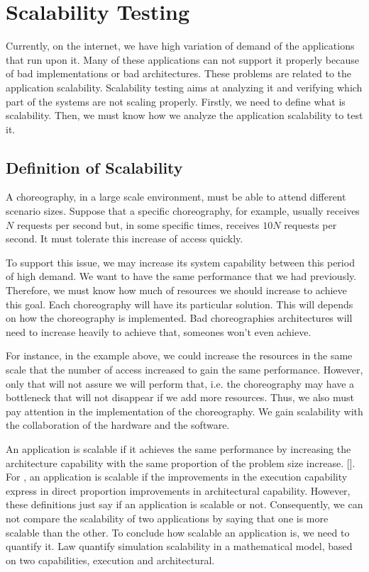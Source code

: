 \section{Scalability Testing}

Currently, on the internet, we have high variation of demand of the applications that run upon it. Many of these applications can not support it properly because of bad implementations or bad architectures. These problems are related to the application scalability. Scalability testing aims at analyzing it and verifying which part of the systems are not scaling properly. Firstly, we need to define what is scalability. Then, we must know how we analyze the application scalability to test it. 

\subsection{Definition of Scalability}
A choreography, in a large scale environment, must be able to attend different scenario sizes. Suppose that a specific choreography, for example, usually receives $N$ requests per second but, in some specific times, receives $10N$ requests per second. It must tolerate this increase of access quickly.

To support this issue, we may increase its system capability between this period of high demand. We want to have the same performance that we had previously. Therefore, we must know how much of resources we should increase to achieve this goal.  Each choreography will have its particular solution. This will depends on how the choreography is implemented. Bad choreographies architectures will need to increase heavily to achieve that, someones won't even achieve.

For instance, in the example above, we could increase the resources in the same scale that the number of access increased to gain the same performance. However, only that will not assure we will perform that, i.e.  the choreography may have a bottleneck that will not disappear if we add more resources. Thus, we also must pay attention in the implementation of the choreography. We gain scalability with the collaboration of the hardware and the software. 

An application is scalable if it achieves the same performance by increasing the architecture capability with the same proportion of the problem size increase. [\citet{QUINN}]. For \citet{LAW}, an application is scalable if the improvements in the execution capability express in direct proportion improvements in architectural capability. However, these definitions just say if an application is scalable or not. Consequently, we can not compare the scalability of two applications by saying that one is more scalable than the other. To conclude how scalable an application is, we need to quantify it. Law quantify simulation scalability in a mathematical model, based on two capabilities, execution and architectural. 

